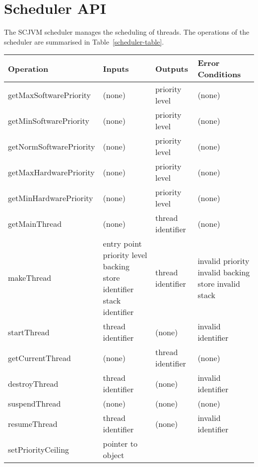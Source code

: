 \documentclass[a4paper,10pt]{report}
\begin{document}
\section{Scheduler API}
\label{scheduler-sec}

The SCJVM scheduler manages the scheduling of threads. The operations of the
scheduler are summarised in Table~\ref{scheduler-table}.

\begin{table}[ht]
  \centering
  \footnotesize
  \begin{tabular}{|l|p{3cm}|p{2.2cm}|p{2.7cm}|}
    Operation & Inputs & Outputs & Error Conditions \\
    \hline
    getMaxSoftwarePriority &
      (none) &
      priority level &
      (none)
    \\getMinSoftwarePriority &
      (none) &
      priority level &
      (none)
    \\getNormSoftwarePriority &
      (none) &
      priority level &
      (none)
    \\getMaxHardwarePriority &
      (none) &
      priority level &
      (none)
    \\getMinHardwarePriority &
      (none) &
      priority level &
      (none)
    \\getMainThread &
      (none) &
      thread identifier &
      (none)
    \\makeThread &
      entry point \newline
      priority level \newline
      backing store identifier \newline
      stack identifier &
      thread identifier &
      invalid priority \newline
      invalid backing store \newline
      invalid stack
    \\startThread &
      thread identifier &
      (none) &
      invalid identifier
    \\getCurrentThread &
      (none) &
      thread identifier &
      (none)
    \\destroyThread &
      thread identifier &
      (none) &
      invalid identifier
    \\suspendThread &
      (none) &
      (none) &
      (none)
    \\resumeThread &
      thread identifier &
      (none) &
      invalid identifier
    \\setPriorityCeiling &
      pointer to object \newline

\end{tabular}
\end{table}
\end{document}
